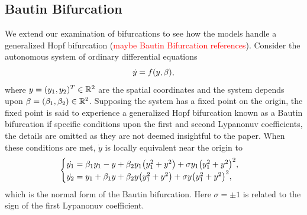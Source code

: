 \subsection{Bautin Bifurcation}
We extend our examination of bifurcations to see how the models handle a generalized Hopf bifurcation (\textcolor{red}{maybe Bautin Bifurcation references}). Consider the autonomous system of ordinary differential equations
\begin{equation}
    \dot{y} = f{\left(y, \beta\right)},
\end{equation}
where $y = (y_1,y_2)^T \in \mathbb{R}^2$ are the spatial coordinates and the system depends upon $\beta = (\beta_1,\beta_2) \in \mathbb{R}^2$. Supposing the system has a fixed point on the origin, the fixed point is said to experience a generalized Hopf bifurcation known as a Bautin bifurcation if specific conditions upon the first and second Lypanonuv coefficients, the details are omitted as they are not deemed insightful to the paper. When these conditions are met, $\dot{y}$ is locally equivalent near the origin to 
\begin{equation}
    \begin{cases}
        \dot{y_1} = \beta_1 y_1 - y + \beta_2 y_1 {\left(y_1^2 + y^2\right)} + \sigma y_1 {\left(y_1^2 + y^2\right)}^2,\\
        \dot{y_2} = y_1 + \beta_1 y + \beta_2 y {\left(y_1^2 + y^2\right)} + \sigma y {\left(y_1^2 + y^2\right)}^2,
    \end{cases}
\end{equation}
which is the normal form of the Bautin bifurcation. Here $\sigma = \pm 1$ is related to the sign of the first Lypanonuv coefficient. 

